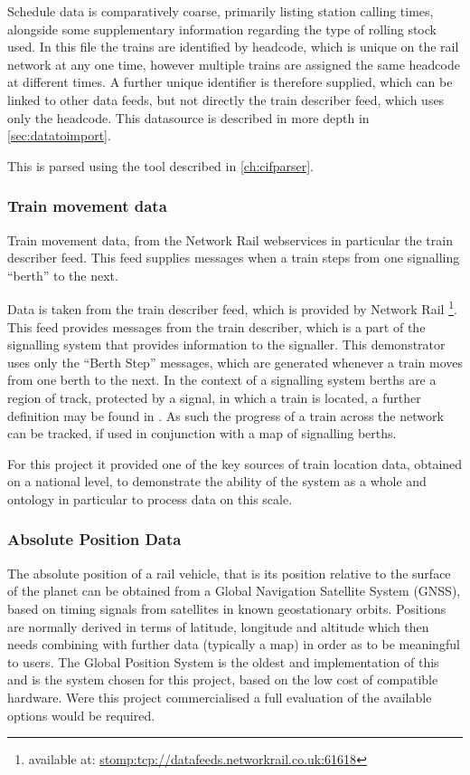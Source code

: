 Schedule data is comparatively coarse, primarily listing station calling times, alongside some supplementary information regarding the type of rolling stock used. In this file the trains are identified by headcode, which is unique on the rail network at any one time, however multiple trains are assigned the same headcode at different times. A further unique identifier is therefore supplied, which can be linked to other data feeds, but not directly the train describer feed, which uses only the headcode. This datasource is described in more depth in \autoref{sec:datatoimport}.

This is parsed using the tool described in \autoref{ch:cifparser}.
   
\subsubsection{Train movement data}
Train movement data, from the Network Rail webservices in particular the train describer feed. This feed supplies messages when a train steps from one signalling ``berth'' to the next.

Data is taken from the train describer feed, which is provided by Network Rail \footnote{available at: \url{stomp:tcp://datafeeds.networkrail.co.uk:61618}}. This feed provides messages from the train describer, which is a part of the signalling system that provides information to the signaller. This demonstrator uses only the ``Berth Step'' messages, which are generated whenever a train moves from one berth to the next. In the context of a signalling system berths are a region of track, protected by a signal, in which a train is located, a further definition may be found in \citet{Woolford2004}. As such the progress of a train across the network can be tracked, if used in conjunction with a map of signalling berths.

For this project it provided one of the key sources of train location data, obtained on a national level, to demonstrate the ability of the system as a whole and ontology in particular to process data on this scale.

\subsubsection{Absolute Position Data}
The absolute position of a rail vehicle, that is its position relative to the surface of the planet can be obtained from a Global Navigation Satellite System (GNSS), based on timing signals from satellites in known geostationary orbits. Positions are normally derived in terms of latitude, longitude and altitude which then needs combining with further data (typically a map) in order as to be meaningful to users. The Global Position System is the oldest and implementation of this and is the system chosen for this project, based on the low cost of compatible hardware. Were this project commercialised a full evaluation of the available options would be required.

